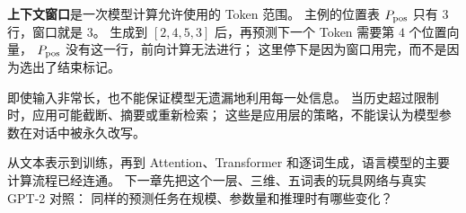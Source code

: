 \textbf{上下文窗口}是一次模型计算允许使用的 Token 范围。
主例的位置表 $P_{\rm pos}$ 只有 $3$ 行，窗口就是 $3$。
生成到 $[2,4,5,3]$ 后，再预测下一个 Token 需要第 $4$ 个位置向量，
$P_{\rm pos}$ 没有这一行，前向计算无法进行；
这里停下是因为窗口用完，而不是因为选出了结束标记。
\begin{boundarybox}
即使输入非常长，也不能保证模型无遗漏地利用每一处信息。
当历史超过限制时，应用可能截断、摘要或重新检索；
这些是应用层的策略，不能误认为模型参数在对话中被永久改写。
\end{boundarybox}



\par\smallskip
从文本表示到训练，再到 Attention、Transformer 和逐词生成，语言模型的主要计算流程已经连通。
下一章先把这个一层、三维、五词表的玩具网络与真实 GPT-2 对照：
同样的预测任务在规模、参数量和推理时有哪些变化？
